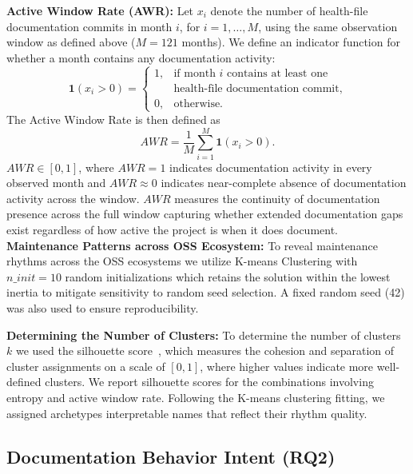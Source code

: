 \documentclass[10pt,conference]{IEEEtran}
\newcommand{\BJohnson}[1]{\textcolor{purple}{{\bfseries [[#1]]}}}
\newcommand{\MGuizani}[1]{\textcolor{blue}{{\bfseries [[#1]]}}}
\begin{document}
{\textbf{Active Window Rate (AWR):}
Let $x_i$ denote the number of health-file documentation commits in month 
$i$, for $i = 1, \dots, M$, using the same observation window as defined 
above ($M = 121$ months). We define an indicator function for whether a
month contains any documentation activity:
\[
  \mathbf{1}(x_i > 0) =
  \begin{cases}
    1, & \text{if month } i \text{ contains at least one} \\
       & \text{health-file documentation commit,} \\
    0, & \text{otherwise.}
  \end{cases}
\]
The Active Window Rate is then defined as
\[
  \mathit{AWR} = \frac{1}{M} \sum_{i=1}^{M} \mathbf{1}(x_i > 0).
\]
$\mathit{AWR} \in [0, 1]$, where $\mathit{AWR} = 1$ indicates documentation 
activity in every observed month and $\mathit{AWR} \approx 0$ indicates 
near-complete absence of documentation activity across the window. 
 $\mathit{AWR}$ measures the continuity of documentation presence across the full window capturing whether extended documentation gaps exist regardless of how active the project is when it does document.
\textbf{Maintenance Patterns across OSS Ecosystem:} To reveal maintenance rhythms across the OSS ecosystems we utilize K-means Clustering \cite{mcqueen1967some} with $n\_init = 10$ random initializations which retains the solution within the lowest inertia to mitigate sensitivity to random seed selection. A fixed random seed (42) was also used to ensure reproducibility. 

\textbf{ Determining the Number of Clusters:}
To determine the number of clusters $k$ we used the silhouette score~\cite{rousseeuw1987silhouettes}, which measures the cohesion and separation of cluster assignments on a  scale of $[0, 1]$, where higher values indicate more well-defined clusters. 
We report silhouette scores for the combinations involving entropy and active window rate. Following the K-means clustering fitting, we assigned archetypes interpretable names that reflect their rhythm quality.

\subsection{ Documentation Behavior Intent (RQ2) }\label{RQ2}


}
\end{document}
